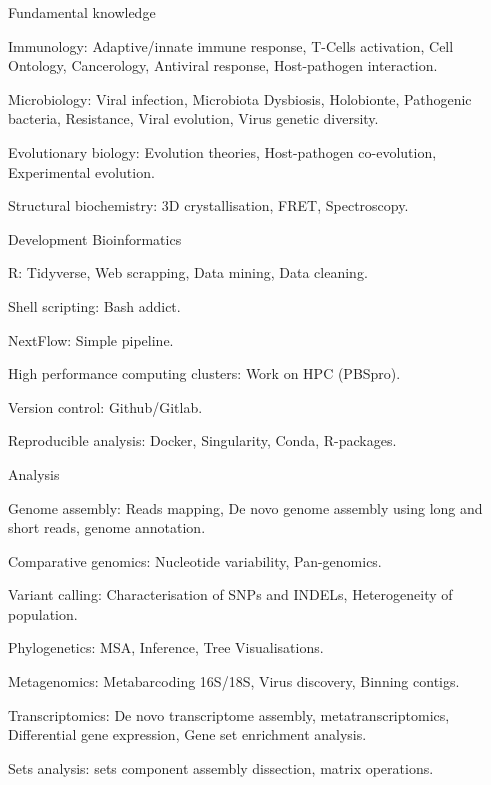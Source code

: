 \begin{cventries}
  \cventry
    {Fundamental knowledge} %
    {} %
    {} %
    {} %
    {
      \begin{cvitems} %
        \item {Immunology: Adaptive/innate immune response, T-Cells activation, Cell Ontology, Cancerology, Antiviral response, Host-pathogen interaction.}
        \item {Microbiology: Viral infection, Microbiota Dysbiosis, Holobionte, Pathogenic bacteria, Resistance, Viral evolution, Virus genetic diversity.}
        \item {Evolutionary biology: Evolution theories, Host-pathogen co-evolution, Experimental evolution.}
        \item {Structural biochemistry: 3D crystallisation, FRET, Spectroscopy.}
      \end{cvitems}
    }

  \cventry
    {Development} %
    {Bioinformatics} %
    {} %
    {} %
    {
      \begin{cvitems} %
        \item {R: Tidyverse, Web scrapping, Data mining, Data cleaning.}
        \item {Shell scripting: Bash addict.}
        \item {NextFlow: Simple pipeline.}
        \item {High performance computing clusters: Work on HPC (PBSpro).}
        \item {Version control: Github/Gitlab.}
        \item {Reproducible analysis: Docker, Singularity, Conda, R-packages.}
      \end{cvitems}
    }

  \cventry
    {Analysis} %
    {} %
    {} %
    {} %
    {
      \begin{cvitems} %
        \item {Genome assembly: Reads mapping, De novo genome assembly using long and short reads, genome annotation.}
        \item {Comparative genomics: Nucleotide variability, Pan-genomics.}
        \item {Variant calling: Characterisation of SNPs and INDELs, Heterogeneity of population.}
        \item {Phylogenetics: MSA, Inference, Tree Visualisations.}
        \item {Metagenomics: Metabarcoding 16S/18S, Virus discovery, Binning contigs.}
        \item {Transcriptomics: De novo transcriptome assembly, metatranscriptomics, Differential gene expression, Gene set enrichment analysis.}
        \item {Sets analysis: sets component assembly dissection, matrix operations.}
      \end{cvitems}
    }


\end{cventries}